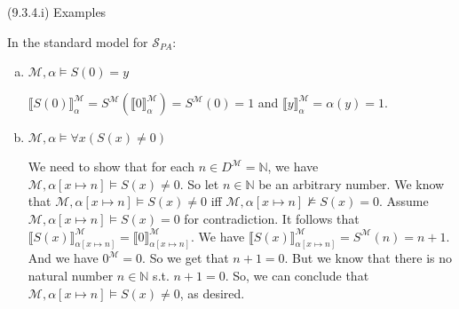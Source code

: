 \begin{frame}{(9.3.4.i) Examples}

In the standard model for $\mathcal{S}_{PA}$:

\begin{enumerate}[(a)]
			
				\item $\mathcal{M},\alpha\vDash S(0)=y$
				
				$\llbracket S(0)\rrbracket^\mathcal{M}_\alpha=S^\mathcal{M}(\llbracket 0\rrbracket^\mathcal{M}_\alpha)=S^\mathcal{M}(0)=1$ and $\llbracket y\rrbracket^\mathcal{M}_\alpha=\alpha(y)=1$.
				
				\setcounter{enumi}{5}
				
%								
%				
%				
%									
									
				\item $\mathcal{M},\alpha\vDash\forall x(S(x)\neq 0)$

				{We need to show that for each  $n\in D^\mathcal{M}=\mathbb{N}$, we have $\mathcal{M},\alpha[x\mapsto n]\vDash S(x)\neq 0$. So let $n\in \mathbb{N}$ be an arbitrary number. We know that  $\mathcal{M},\alpha[x\mapsto n]\vDash S(x)\neq 0$ iff $\mathcal{M},\alpha[x\mapsto n]\nvDash S(x)=0$. Assume $\mathcal{M},\alpha[x\mapsto n]\vDash S(x)=0$ for contradiction. It follows that $\llbracket S(x)\rrbracket^\mathcal{M}_{\alpha[x\mapsto n]}=\llbracket0\rrbracket^\mathcal{M}_{\alpha[x\mapsto n]}$. We have $\llbracket S(x)\rrbracket^\mathcal{M}_{\alpha[x\mapsto n]}=S^\mathcal{M}(n)=n+1$. And we have $0^\mathcal{M}=0$. So we get that $n+1=0$. But we know that there is no natural number $n\in\mathbb{N}$ s.t. $n+1=0$. So, we can conclude that $\mathcal{M},\alpha[x\mapsto n]\vDash S(x)\neq 0$, as desired.}
				
				\end{enumerate}
				
				\end{frame}

